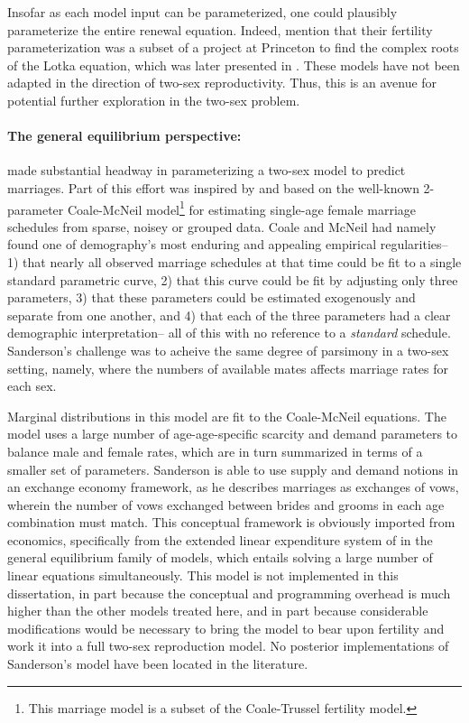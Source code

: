 Insofar as each model input can be parameterized, one could plausibly
parameterize the entire renewal equation. Indeed, \citet{coale1974model} mention
that their fertility parameterization was a subset of a project at
Princeton to find the complex roots of the Lotka equation, which
was later presented in \citet{james1977determinants}. These models have not 
been adapted in the direction of two-sex reproductivity. Thus, this is an avenue
for potential further exploration in the two-sex problem.

\paragraph{The general equilibrium perspective: } \citet{marriage1981warren,
sanderson1983two} made substantial headway in parameterizing a two-sex model to predict marriages. Part of this effort was
inspired by and based on the well-known 2-parameter Coale-McNeil
model\citep{coale1972distribution, coale1971age}\footnote{This marriage model is
a subset of the Coale-Trussel fertility model.} for estimating
single-age female marriage schedules from sparse, noisey or grouped
data. Coale and McNeil had namely found one of demography's most enduring 
and appealing empirical regularities-- 1) that nearly 
all observed marriage schedules at that time could be fit to a single standard parametric
curve, 2) that this curve could be fit by adjusting only three parameters, 3)
that these parameters could be estimated exogenously and separate from one
another, and 4) that each of the three parameters had a clear demographic
interpretation-- all of this with no reference to a \textit{standard}
schedule. Sanderson's challenge was to acheive the same degree of parsimony in a
two-sex setting, namely, where the numbers of available mates affects marriage
rates for each sex. 

Marginal distributions in this model are fit to the
Coale-McNeil equations. The model uses a large number of
age-age-specific scarcity and demand parameters to balance male and female
rates, which are in turn summarized in terms of a smaller set of parameters.
Sanderson is able to use supply and demand notions in an exchange economy
framework, as he describes marriages as exchanges of vows, wherein the number
of vows exchanged between brides and grooms in each age combination must
match. This conceptual framework is obviously imported from economics,
specifically from the extended linear expenditure system of
\citet{lluch1977patterns} in the general equilibrium family of models, which entails solving a large number of linear
equations simultaneously. This model is not implemented in this dissertation, 
in part because the conceptual and programming overhead is much higher
than the other models treated here, and in part because considerable
modifications would be necessary to bring the model to bear upon fertility and
work it into a full two-sex reproduction model. No posterior implementations of
Sanderson's model have been located in the literature.

